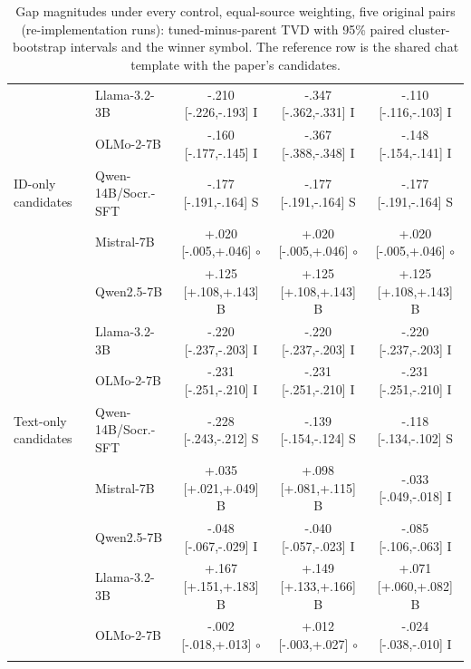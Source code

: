 \begin{table}[t]
\begin{tabular}{@{}llccc@{}}
 & Llama-3.2-3B & -.210 [-.226,-.193] I & -.347 [-.362,-.331] I & -.110 [-.116,-.103] I \\
 & OLMo-2-7B & -.160 [-.177,-.145] I & -.367 [-.388,-.348] I & -.148 [-.154,-.141] I \\
\addlinespace[1pt]
ID-only candidates & Qwen-14B/Socr.-SFT & -.177 [-.191,-.164] S & -.177 [-.191,-.164] S & -.177 [-.191,-.164] S \\
 & Mistral-7B & +.020 [-.005,+.046] $\circ$ & +.020 [-.005,+.046] $\circ$ & +.020 [-.005,+.046] $\circ$ \\
 & Qwen2.5-7B & +.125 [+.108,+.143] B & +.125 [+.108,+.143] B & +.125 [+.108,+.143] B \\
 & Llama-3.2-3B & -.220 [-.237,-.203] I & -.220 [-.237,-.203] I & -.220 [-.237,-.203] I \\
 & OLMo-2-7B & -.231 [-.251,-.210] I & -.231 [-.251,-.210] I & -.231 [-.251,-.210] I \\
\addlinespace[1pt]
Text-only candidates & Qwen-14B/Socr.-SFT & -.228 [-.243,-.212] S & -.139 [-.154,-.124] S & -.118 [-.134,-.102] S \\
 & Mistral-7B & +.035 [+.021,+.049] B & +.098 [+.081,+.115] B & -.033 [-.049,-.018] I \\
 & Qwen2.5-7B & -.048 [-.067,-.029] I & -.040 [-.057,-.023] I & -.085 [-.106,-.063] I \\
 & Llama-3.2-3B & +.167 [+.151,+.183] B & +.149 [+.133,+.166] B & +.071 [+.060,+.082] B \\
 & OLMo-2-7B & -.002 [-.018,+.013] $\circ$ & +.012 [-.003,+.027] $\circ$ & -.024 [-.038,-.010] I \\
\addlinespace[1pt]
\bottomrule
\end{tabular}
\caption{Gap magnitudes under every control, equal-source weighting, five original pairs (re-implementation runs): tuned-minus-parent TVD with 95\% paired cluster-bootstrap intervals and the winner symbol. The reference row is the shared chat template with the paper's candidates.}
\label{tab:controls-gaps-es}
\end{table}
